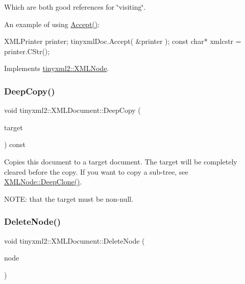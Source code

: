 Which are both good references for \char`\"{}visiting\char`\"{}.

An example of using \mbox{\hyperlink{classtinyxml2_1_1_x_m_l_document_ab7be651917a35ab1ff0e4e6d4e565cdf}{Accept()}}\+: \begin{DoxyVerb}XMLPrinter printer;
tinyxmlDoc.Accept( &printer );
const char* xmlcstr = printer.CStr();
\end{DoxyVerb}
 

Implements \mbox{\hyperlink{classtinyxml2_1_1_x_m_l_node_a81e66df0a44c67a7af17f3b77a152785}{tinyxml2\+::\+X\+M\+L\+Node}}.

\mbox{\label{classtinyxml2_1_1_x_m_l_document_af592ffc91514e25a39664521ac83db45}} 
\subsubsection{\texorpdfstring{Deep\+Copy()}{DeepCopy()}}
{\footnotesize\ttfamily void tinyxml2\+::\+X\+M\+L\+Document\+::\+Deep\+Copy (\begin{DoxyParamCaption}\item[{\mbox{\hyperlink{classtinyxml2_1_1_x_m_l_document}{X\+M\+L\+Document}} $\ast$}]{target }\end{DoxyParamCaption}) const}

Copies this document to a target document. The target will be completely cleared before the copy. If you want to copy a sub-\/tree, see \mbox{\hyperlink{classtinyxml2_1_1_x_m_l_node_a3bb369fd733f1989b751d99a9417adab}{X\+M\+L\+Node\+::\+Deep\+Clone()}}.

N\+O\+TE\+: that the \textquotesingle{}target\textquotesingle{} must be non-\/null. \mbox{\label{classtinyxml2_1_1_x_m_l_document_ac1d6e2c7fcc1a660624ac4f68e96380d}} 
\subsubsection{\texorpdfstring{Delete\+Node()}{DeleteNode()}}
{\footnotesize\ttfamily void tinyxml2\+::\+X\+M\+L\+Document\+::\+Delete\+Node (\begin{DoxyParamCaption}\item[{\mbox{\hyperlink{classtinyxml2_1_1_x_m_l_node}{X\+M\+L\+Node}} $\ast$}]{node }\end{DoxyParamCaption})}

